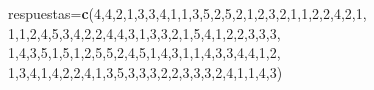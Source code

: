 \documentclass[
]{book}
\newenvironment{Shaded}{\begin{snugshade}}{\end{snugshade}}
\newcommand{\DecValTok}[1]{\textcolor[rgb]{0.00,0.00,0.81}{#1}}
\newcommand{\KeywordTok}[1]{\textcolor[rgb]{0.13,0.29,0.53}{\textbf{#1}}}
\newcommand{\NormalTok}[1]{#1}
\theoremstyle{definition}
\theoremstyle{definition}
\theoremstyle{definition}
\theoremstyle{remark}
\begin{document}
\begin{Shaded}
\begin{Highlighting}[]
\NormalTok{respuestas=}\KeywordTok{c}\NormalTok{(}\DecValTok{4}\NormalTok{,}\DecValTok{4}\NormalTok{,}\DecValTok{2}\NormalTok{,}\DecValTok{1}\NormalTok{,}\DecValTok{3}\NormalTok{,}\DecValTok{3}\NormalTok{,}\DecValTok{4}\NormalTok{,}\DecValTok{1}\NormalTok{,}\DecValTok{1}\NormalTok{,}\DecValTok{3}\NormalTok{,}\DecValTok{5}\NormalTok{,}\DecValTok{2}\NormalTok{,}\DecValTok{5}\NormalTok{,}\DecValTok{2}\NormalTok{,}\DecValTok{1}\NormalTok{,}\DecValTok{2}\NormalTok{,}\DecValTok{3}\NormalTok{,}\DecValTok{2}\NormalTok{,}\DecValTok{1}\NormalTok{,}\DecValTok{1}\NormalTok{,}\DecValTok{2}\NormalTok{,}\DecValTok{2}\NormalTok{,}\DecValTok{4}\NormalTok{,}\DecValTok{2}\NormalTok{,}\DecValTok{1}\NormalTok{,}
             \DecValTok{1}\NormalTok{,}\DecValTok{1}\NormalTok{,}\DecValTok{2}\NormalTok{,}\DecValTok{4}\NormalTok{,}\DecValTok{5}\NormalTok{,}\DecValTok{3}\NormalTok{,}\DecValTok{4}\NormalTok{,}\DecValTok{2}\NormalTok{,}\DecValTok{2}\NormalTok{,}\DecValTok{4}\NormalTok{,}\DecValTok{4}\NormalTok{,}\DecValTok{3}\NormalTok{,}\DecValTok{1}\NormalTok{,}\DecValTok{3}\NormalTok{,}\DecValTok{3}\NormalTok{,}\DecValTok{2}\NormalTok{,}\DecValTok{1}\NormalTok{,}\DecValTok{5}\NormalTok{,}\DecValTok{4}\NormalTok{,}\DecValTok{1}\NormalTok{,}\DecValTok{2}\NormalTok{,}\DecValTok{2}\NormalTok{,}\DecValTok{3}\NormalTok{,}\DecValTok{3}\NormalTok{,}\DecValTok{3}\NormalTok{,}
             \DecValTok{1}\NormalTok{,}\DecValTok{4}\NormalTok{,}\DecValTok{3}\NormalTok{,}\DecValTok{5}\NormalTok{,}\DecValTok{1}\NormalTok{,}\DecValTok{5}\NormalTok{,}\DecValTok{1}\NormalTok{,}\DecValTok{2}\NormalTok{,}\DecValTok{5}\NormalTok{,}\DecValTok{5}\NormalTok{,}\DecValTok{2}\NormalTok{,}\DecValTok{4}\NormalTok{,}\DecValTok{5}\NormalTok{,}\DecValTok{1}\NormalTok{,}\DecValTok{4}\NormalTok{,}\DecValTok{3}\NormalTok{,}\DecValTok{1}\NormalTok{,}\DecValTok{1}\NormalTok{,}\DecValTok{4}\NormalTok{,}\DecValTok{3}\NormalTok{,}\DecValTok{3}\NormalTok{,}\DecValTok{4}\NormalTok{,}\DecValTok{4}\NormalTok{,}\DecValTok{1}\NormalTok{,}\DecValTok{2}\NormalTok{,}
             \DecValTok{1}\NormalTok{,}\DecValTok{3}\NormalTok{,}\DecValTok{4}\NormalTok{,}\DecValTok{1}\NormalTok{,}\DecValTok{4}\NormalTok{,}\DecValTok{2}\NormalTok{,}\DecValTok{2}\NormalTok{,}\DecValTok{4}\NormalTok{,}\DecValTok{1}\NormalTok{,}\DecValTok{3}\NormalTok{,}\DecValTok{5}\NormalTok{,}\DecValTok{3}\NormalTok{,}\DecValTok{3}\NormalTok{,}\DecValTok{3}\NormalTok{,}\DecValTok{2}\NormalTok{,}\DecValTok{2}\NormalTok{,}\DecValTok{3}\NormalTok{,}\DecValTok{3}\NormalTok{,}\DecValTok{3}\NormalTok{,}\DecValTok{2}\NormalTok{,}\DecValTok{4}\NormalTok{,}\DecValTok{1}\NormalTok{,}\DecValTok{1}\NormalTok{,}\DecValTok{4}\NormalTok{,}\DecValTok{3}\NormalTok{)}
\end{Highlighting}
\end{Shaded}
\end{document}
